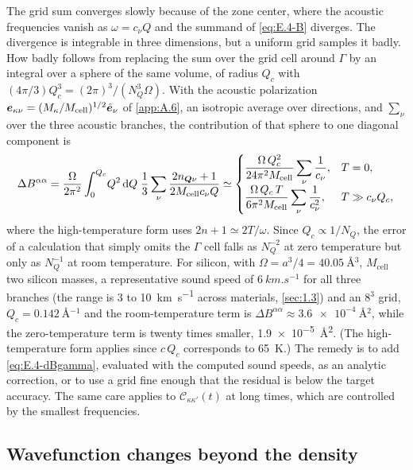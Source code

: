 The grid sum converges slowly because of the zone center, where the acoustic frequencies vanish as $\omega = c_\nu Q$ and the summand of \cref{eq:E.4-B} diverges. The divergence is integrable in three dimensions, but a uniform grid samples it badly. How badly follows from replacing the sum over the grid cell around $\Gamma$ by an integral over a sphere of the same volume, of radius $Q_c$ with $(4\pi/3)Q_c^3 = (2\pi)^3/(N_Q^3\Omega)$. With the acoustic polarization $\bm{e}_{\kappa\nu} = (M_\kappa/M_{\mathrm{cell}})^{1/2}\hat{\bm{e}}_\nu$ of \cref{app:A.6}, an isotropic average over directions, and $\sum_\nu$ over the three acoustic branches, the contribution of that sphere to one diagonal component is
\begin{equation}
  \Delta B^{\alpha\alpha} = \frac{\Omega}{2\pi^2}\int_0^{Q_c}\!Q^2\,\mathrm{d} Q\;\frac13\sum_\nu\frac{2n_{\bm{Q}\nu}+1}{2M_{\mathrm{cell}}c_\nu Q}
  \simeq
  \begin{cases}
    \dfrac{\Omega\,Q_c^2}{24\pi^2M_{\mathrm{cell}}}\displaystyle\sum_\nu\frac{1}{c_\nu}, & T = 0,\\[2ex]
    \dfrac{\Omega\,Q_c\,T}{6\pi^2M_{\mathrm{cell}}}\displaystyle\sum_\nu\frac{1}{c_\nu^2}, & T \gg c_\nu Q_c,
  \end{cases}
  \label{eq:E.4-dBgamma}
\end{equation}
where the high-temperature form uses $2n + 1 \simeq 2T/\omega$. Since $Q_c \propto 1/N_Q$, the error of a calculation that simply omits the $\Gamma$ cell falls as $N_Q^{-2}$ at zero temperature but only as $N_Q^{-1}$ at room temperature. For silicon, with $\Omega = a^3/4 = \SI{40.05}{\angstrom^3}$, $M_{\mathrm{cell}}$ two silicon masses, a representative sound speed of $\SI{6}{km.s^{-1}}$ for all three branches (the range is 3 to \SI{10}{km.s^{-1}} across materials, \cref{sec:1.3}) and an $8^3$ grid, $Q_c = \SI{0.142}{\angstrom^{-1}}$ and the room-temperature term is $\Delta B^{\alpha\alpha} \approx \SI{3.6e-4}{\angstrom^2}$, while the zero-temperature term is twenty times smaller, \SI{1.9e-5}{\angstrom^2}. (The high-temperature form applies since $c\,Q_c$ corresponds to \SI{65}{K}.) The remedy is to add \cref{eq:E.4-dBgamma}, evaluated with the computed sound speeds, as an analytic correction, or to use a grid fine enough that the residual is below the target accuracy. The same care applies to $\mathcal{C}_{\kappa\kappa'}(t)$ at long times, which are controlled by the smallest frequencies.

\subsection{Wavefunction changes beyond the density}

